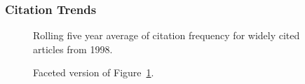\documentclass[
  10pt,
  letterpaper,
  DIV=11,
  numbers=noendperiod,
  twoside]{scrartcl}
\begin{document}
\subsubsection*{Citation Trends}\label{sec-trends-1998}

\begin{figure}


\caption{\label{fig-citation-spaghetti-1998}Rolling five year average of
citation frequency for widely cited articles from 1998.}

\end{figure}%

\begin{figure}


\caption{\label{fig-citation-facet-1998}Faceted version of
Figure~\ref{fig-citation-spaghetti-1998}.}

\end{figure}%
\end{document}
